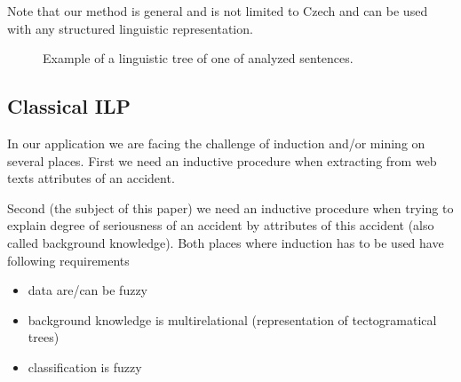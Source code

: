 \documentclass[authoryear,12pt]{elsarticle}
\begin{document}
Note that our method is general and is not limited to Czech and can be used with any structured linguistic representation. 


\begin{figure}
\medskip
\centerline{}
\caption{Example of a linguistic tree of one of analyzed sentences.}
\label{dedek:tree}
\end{figure}



\subsection{Classical ILP}

In our application we are facing the challenge of induction and/or mining on several places. First we need an inductive procedure when extracting from web texts attributes of an accident. 

Second (the subject of this paper) we need an inductive procedure when trying to explain degree of seriousness of an accident by attributes of this accident (also called background knowledge).
%
Both places where induction has to be used have following requirements


\begin{itemize}
	\item data are/can be fuzzy
	\item background knowledge is multirelational (representation of tectogramatical trees)
	\item classification is fuzzy
\end{itemize}
\end{document}
